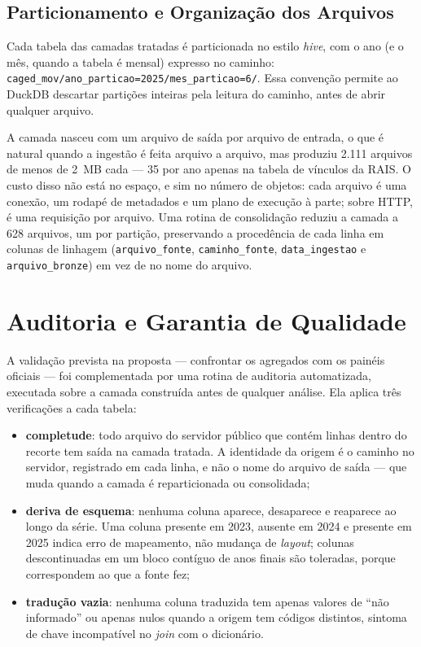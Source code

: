 \subsection{Particionamento e Organização dos Arquivos}

Cada tabela das camadas tratadas é particionada no estilo \textit{hive}, com o ano (e o mês, quando a tabela é mensal) expresso no caminho: \nolinkurl{caged_mov/ano_particao=2025/mes_particao=6/}. Essa convenção permite ao DuckDB descartar partições inteiras pela leitura do caminho, antes de abrir qualquer arquivo.

A camada nasceu com um arquivo de saída por arquivo de entrada, o que é natural quando a ingestão é feita arquivo a arquivo, mas produziu 2.111 arquivos de menos de 2~MB cada --- 35 por ano apenas na tabela de vínculos da RAIS. O custo disso não está no espaço, e sim no número de objetos: cada arquivo é uma conexão, um rodapé de metadados e um plano de execução à parte; sobre HTTP, é uma requisição por arquivo. Uma rotina de consolidação reduziu a camada a 628 arquivos, um por partição, preservando a procedência de cada linha em colunas de linhagem (\texttt{arquivo\_fonte}, \texttt{caminho\_fonte}, \texttt{data\_ingestao} e \texttt{arquivo\_bronze}) em vez de no nome do arquivo.

\section{Auditoria e Garantia de Qualidade}
\label{sec:auditoria}

A validação prevista na proposta --- confrontar os agregados com os painéis oficiais --- foi complementada por uma rotina de auditoria automatizada, executada sobre a camada construída antes de qualquer análise. Ela aplica três verificações a cada tabela:

\begin{itemize}
    \item \textbf{completude}: todo arquivo do servidor público que contém linhas dentro do recorte tem saída na camada tratada. A identidade da origem é o caminho no servidor, registrado em cada linha, e não o nome do arquivo de saída --- que muda quando a camada é reparticionada ou consolidada;
    \item \textbf{deriva de esquema}: nenhuma coluna aparece, desaparece e reaparece ao longo da série. Uma coluna presente em 2023, ausente em 2024 e presente em 2025 indica erro de mapeamento, não mudança de \textit{layout}; colunas descontinuadas em um bloco contíguo de anos finais são toleradas, porque correspondem ao que a fonte fez;
    \item \textbf{tradução vazia}: nenhuma coluna traduzida tem apenas valores de ``não informado'' ou apenas nulos quando a origem tem códigos distintos, sintoma de chave incompatível no \textit{join} com o dicionário.
\end{itemize}

